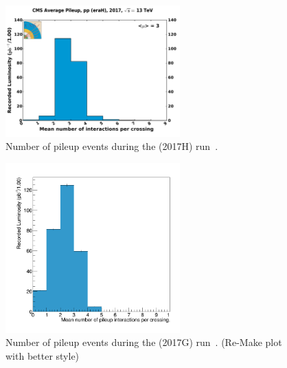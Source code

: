\begin{figure}[htb]
\centering
  \includegraphics[width=0.6\textwidth]{plots/Data/pileup_pp_lowPU_2017.pdf}
  \caption{Number of pileup events during the \sh (2017H) run~\cite{LumiCalibTwiki}.}
  \label{fig:data:lumiPU13}
\end{figure}

\begin{figure}[htb]
\centering
  \includegraphics[width=0.6\textwidth]{plots/Data/pileup_5TeV.png}
  \caption{Number of pileup events during the \sg (2017G) run~\cite{LumiCalibTwiki}. (Re-Make plot with better style)}
  \label{fig:data:lumiPU5}
\end{figure}